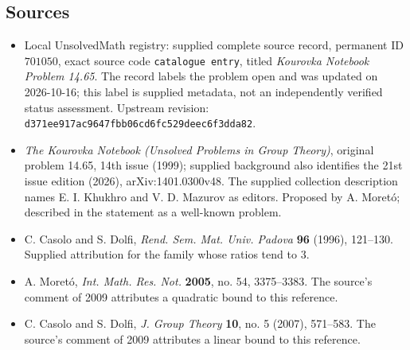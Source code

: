 \documentclass[11pt]{article}
\begin{document}
\subsection{Sources}
\begin{itemize}
\item Local UnsolvedMath registry: supplied complete source record, permanent ID \(701050\), exact source code \texttt{catalogue entry}, titled \emph{Kourovka Notebook Problem 14.65}. The record labels the problem open and was updated on 2026-10-16; this label is supplied metadata, not an independently verified status assessment. Upstream revision: \texttt{d371ee917ac9647fbb06cd6fc529deec6f3dda82}.
\item \emph{The Kourovka Notebook (Unsolved Problems in Group Theory)}, original problem 14.65, 14th issue (1999); supplied background also identifies the 21st issue edition (2026), arXiv:1401.0300v48. The supplied collection description names E. I. Khukhro and V. D. Mazurov as editors. Proposed by A. Moret\'{o}; described in the statement as a well-known problem.
\item C. Casolo and S. Dolfi, \emph{Rend. Sem. Mat. Univ. Padova} \textbf{96} (1996), 121--130. Supplied attribution for the family whose ratios tend to \(3\).
\item A. Moret\'{o}, \emph{Int. Math. Res. Not.} \textbf{2005}, no. 54, 3375--3383. The source's comment of 2009 attributes a quadratic bound to this reference.
\item C. Casolo and S. Dolfi, \emph{J. Group Theory} \textbf{10}, no. 5 (2007), 571--583. The source's comment of 2009 attributes a linear bound to this reference.
\end{itemize}
\end{document}
